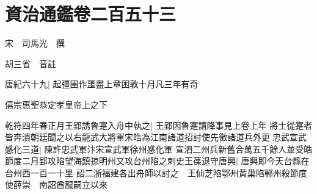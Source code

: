 \section{資治通鑑卷二百五十三}
宋　司馬光　撰

胡三省　音註

唐紀六十九|{
	起彊圉作噩盡上章困敦十月凡三年有奇}


僖宗惠聖恭定孝皇帝上之下

乾符四年春正月王郢誘魯寔入舟中執之|{
	王郢因魯寔請降事見上卷上年}
將士從寔者皆奔潰朝廷聞之以右龍武大將軍宋皓為江南諸道招討使先徵諸道兵外更忠武宣武感化三道|{
	陳許忠武軍汴宋宣武軍徐州感化軍}
宣泗二州兵新舊合萬五千餘人並受皓節度二月郢攻陷望海鎮掠明州又攻台州陷之刺史王葆退守唐興|{
	唐興即今天台縣在台州西一百一十里}
詔二浙福建各出舟師以討之　王仙芝陷鄂州黄巢陷鄆州殺節度使薛崇　南詔酋龍嗣立以來

